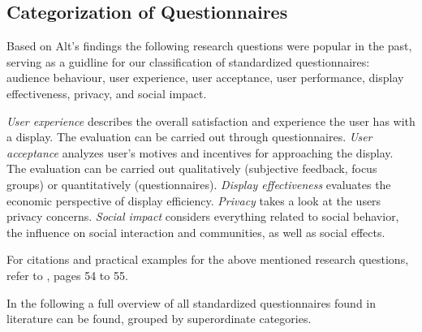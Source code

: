 




\subsection{Categorization of Questionnaires}



	Based on Alt's \cite{alt2013thesis} findings the following research questions were popular in the past, serving as a guidline for our classification of standardized questionnaires: audience behaviour, user experience, user acceptance, user performance, display effectiveness, privacy, and social impact. 


		\textit{User experience} describes the overall satisfaction and experience the user has with a display. The evaluation can be carried out through questionnaires.
		\textit{User acceptance} analyzes user's motives and incentives for approaching the display. The evaluation can be carried out qualitatively (subjective feedback, focus groups) or quantitatively (questionnaires).
		\textit{Display effectiveness} evaluates the economic perspective of display efficiency. 
		\textit{Privacy} takes a look at the users privacy concerns.
		\textit{Social impact} considers everything related to social behavior, the influence on social interaction and communities, as well as social effects.

	For citations and practical examples for the above mentioned research questions, refer to \cite{alt2013thesis}, pages 54 to 55.




	In the following a full overview of all standardized questionnaires found in literature can be found, grouped by superordinate categories.


